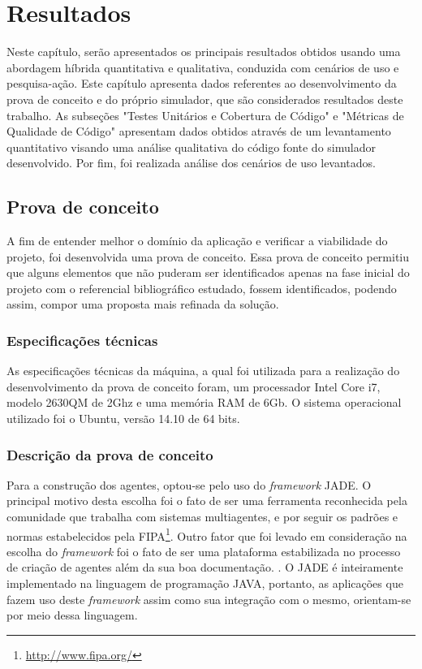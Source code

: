 \chapter[Resultados]{Resultados}

Neste capítulo, serão apresentados os principais resultados obtidos usando uma abordagem híbrida quantitativa e qualitativa, conduzida com cenários de uso e pesquisa-ação. Este capítulo apresenta dados referentes ao desenvolvimento da prova de conceito e do próprio simulador, que são considerados resultados deste trabalho. As subseções "Testes Unitários e Cobertura de Código" e "Métricas de Qualidade de Código" apresentam dados obtidos através de um levantamento quantitativo visando uma análise qualitativa do código fonte do simulador desenvolvido. Por fim, foi realizada análise dos cenários de uso levantados.

\section{Prova de conceito}

A fim de entender melhor o domínio da aplicação e verificar a viabilidade do projeto, foi desenvolvida uma prova de conceito. Essa prova de conceito permitiu que alguns elementos que não puderam ser identificados apenas na fase inicial do projeto com o referencial bibliográfico estudado, fossem identificados, podendo assim, compor uma proposta mais refinada da solução. 

\subsection{Especificações técnicas}

As especificações técnicas da máquina, a qual foi utilizada para a realização do desenvolvimento da prova de conceito foram, um processador Intel Core i7, modelo 2630QM de 2Ghz e uma memória RAM de 6Gb. O sistema operacional utilizado foi o Ubuntu, versão 14.10 de 64 bits.

\subsection{Descrição da prova de conceito}

Para a construção dos agentes, optou-se pelo uso do \textit{framework} JADE. O principal motivo desta escolha foi o fato de ser uma ferramenta reconhecida pela comunidade que trabalha com sistemas multiagentes, e por seguir os padrões e normas estabelecidos pela FIPA\footnote{\url{http://www.fipa.org/}}. Outro fator que foi levado em consideração na escolha do \textit{framework} foi o fato de ser uma plataforma estabilizada no processo de criação de agentes além da sua boa documentação. \cite{franca}. O JADE é inteiramente implementado na linguagem de programação JAVA, portanto, as aplicações que fazem uso deste \textit{framework} assim como sua integração com o mesmo, orientam-se por meio dessa linguagem. 

